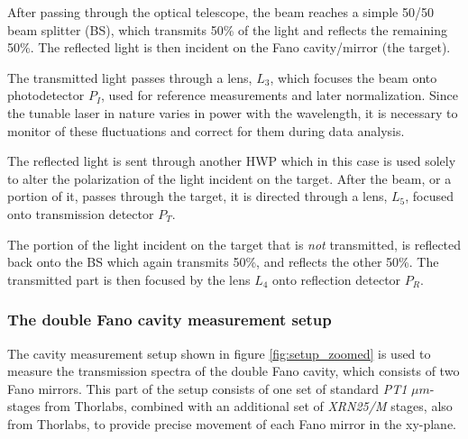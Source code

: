 After passing through the optical telescope, the beam reaches a simple 50/50 beam splitter (BS), which transmits 50\% of the light and reflects the remaining 50\%. The reflected light is then incident on the Fano cavity/mirror (the target). 

The transmitted light passes through a lens, $L_3$, which focuses the beam onto photodetector $P_I$, used for reference measurements and later normalization. Since the tunable laser in nature varies in power with the wavelength, it is necessary to monitor of these fluctuations and correct for them during data analysis. 

The reflected light is sent through another HWP which in this case is used solely to alter the polarization of the light incident on the target. After the beam, or a portion of it, passes through the target, it is directed through a lens, $L_5$, focused onto transmission detector $P_T$.

The portion of the light incident on the target that is \emph{not} transmitted, is reflected back onto the BS which again transmits 50\%, and reflects the other 50\%. The transmitted part is then focused by the lens $L_4$ onto reflection detector $P_R$.

\subsubsection{The double Fano cavity measurement setup}

The cavity measurement setup shown in figure \ref{fig:setup_zoomed} is used to measure the transmission spectra of the double Fano cavity, which consists of two Fano mirrors. This part of the setup consists of one set of standard \emph{PT1} $\mu m$-stages from Thorlabs\cite{thorlabs_stage1}, combined with an additional set of \emph{XRN25/M} stages, also from Thorlabs\cite{thorlabs_stage2}, to provide precise movement of each Fano mirror in the xy-plane. 

